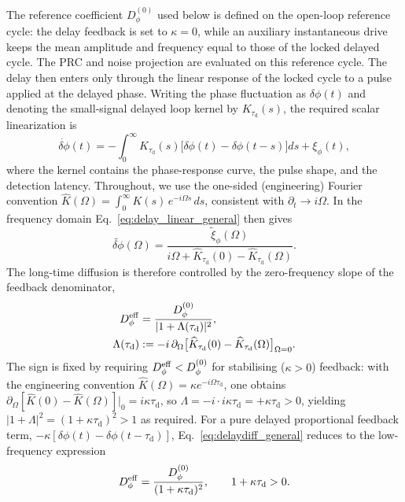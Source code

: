 \documentclass[aps,pre,reprint,amsmath,amssymb,floatfix,nofootinbib]{revtex4-2}
\newcommand{\Dphi}{D_{\phi}}
\newcommand{\taud}{\tau_{\mathrm{d}}}
\begin{document}
The reference coefficient $\Dphi^{(0)}$ used below is defined on the
open-loop reference cycle: the delay feedback is set to $\kappa=0$, while
an auxiliary instantaneous drive keeps the mean amplitude and frequency
equal to those of the locked delayed cycle. The PRC and noise projection
are evaluated on this reference cycle. The delay then enters only through
the linear response of the locked cycle to a pulse applied at the delayed
phase. Writing the phase fluctuation as $\delta\phi(t)$ and denoting the
small-signal delayed loop kernel by $K_{\taud}(s)$, the required scalar
linearization is
\begin{equation}
  \dot{\delta\phi}(t)
  =
  -\int_0^\infty K_{\taud}(s)
  \big[\delta\phi(t)-\delta\phi(t-s)\big]ds
  +\xi_\phi(t),
  \label{eq:delay_linear_general}
\end{equation}
where the kernel contains the phase-response curve, the pulse shape, and
the detection latency. Throughout, we use the one-sided (engineering)
Fourier convention $\widehat K(\Omega)=\int_0^\infty K(s)\,e^{-i\Omega s}\,ds$,
consistent with $\partial_t\to i\Omega$.
In the frequency domain Eq.~\eqref{eq:delay_linear_general} then gives
\begin{equation}
  \widetilde{\delta\phi}(\Omega)
  =
  \frac{\widetilde{\xi}_\phi(\Omega)}
  {i\Omega+\widehat K_{\taud}(0)-\widehat K_{\taud}(\Omega)} .
  \label{eq:delay_filter}
\end{equation}
The long-time diffusion is therefore controlled by the zero-frequency
slope of the feedback denominator,
\begin{align}
  \Dphi^{\rm eff}
  &=
  \frac{\Dphi^{(0)}}{|1+\Lambda(\taud)|^2},
  \label{eq:delaydiff_general}\\
  \Lambda(\taud)
  &:=-i\,\partial_\Omega
  \big[\widehat K_{\taud}(0)-\widehat K_{\taud}(\Omega)\big]_{\Omega=0}.
  \nonumber
\end{align}
The sign is fixed by requiring $D_\phi^{\rm eff}<D_\phi^{(0)}$ for
stabilising ($\kappa>0$) feedback: with the engineering convention
$\widehat K(\Omega)=\kappa e^{-i\Omega\taud}$, one obtains
$\partial_\Omega[\widehat K(0){-}\widehat K(\Omega)]|_0 = i\kappa\taud$,
so $\Lambda = -i\cdot i\kappa\taud = +\kappa\taud > 0$, yielding
$|1+\Lambda|^2=(1+\kappa\taud)^2>1$ as required.
For a pure delayed proportional feedback term,
$-\kappa[\delta\phi(t)-\delta\phi(t-\taud)]$, Eq.~\eqref{eq:delaydiff_general}
reduces to the low-frequency expression
\begin{equation}
  \Dphi^{\rm eff}
  =
  \frac{\Dphi^{(0)}}{(1+\kappa\taud)^2},
  \qquad 1+\kappa\taud>0 .
  \label{eq:pure_delay_diffusion}
\end{equation}
\end{document}
